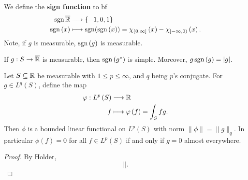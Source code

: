 \begin{definition}
We define the \textbf{sign function} to bf \begin{align*}
	\operatorname{sgn} \overline{\mathbb{R}} &\longrightarrow \{-1, 0, 1\}  \\
	\operatorname{sgn}\left( x \right)  &\longmapsto \operatorname{sgn}(\operatorname{sgn}\left( x \right) ) = \chi_{\left( 0, \infty \right] }\left( x \right)  - \chi_{\left[ -\infty, 0 \right) }\left( x \right)
.\end{align*}
Note, if \(g\) is measurable, \(\operatorname{sgn}\left( g \right) \) is measurable.
\end{definition}
\begin{remark}
	If \(g: S \to \overline{\mathbb{R}}\) is measurable, then \(\operatorname{sgn}\left( g^{*} \right) \) is simple. Moreover, \(g \operatorname{sgn}\left( g \right) = \left| g \right| \).
\end{remark}
\begin{theorem}
	Let \(S \subseteq \mathbb{R}\) be measurable with \(1 \le p \le \infty\), and \(q\) being \(p\)'s conjugate. For \(g \in L^{q}\left( S \right) \), define the map \begin{align*}
		\varphi: L^{p}\left( S \right)   &\longrightarrow  \mathbb{R} \\
		f &\longmapsto \varphi\left( f \right)= \int_{S}  fg
	.\end{align*}
	Then \(\phi\) is a bounded linear functional on \(L^{p}\left( S \right) \) with norm \(\|\phi\| = \|g\|_{q}\). In particular \(\phi\left( f \right) = 0\) for all \(f\in L^{p}\left( S \right) \)  if and only if \(g = 0\) almost everywhere.
\end{theorem}
\begin{proof}
	By Holder, \[
	\left|  \right|
	.\]
\end{proof}
